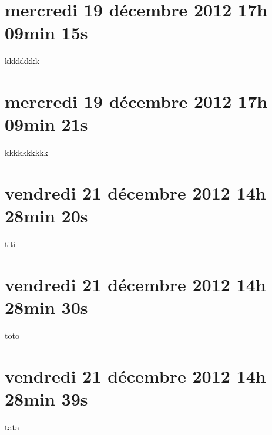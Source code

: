 
\section{mercredi 19 décembre 2012 17h 09min 15s}

kkkkkkkk

\section{mercredi 19 décembre 2012 17h 09min 21s}

kkkkkkkkkk

\section{vendredi 21 décembre 2012 14h 28min 20s}

titi

\section{vendredi 21 décembre 2012 14h 28min 30s}

toto

\section{vendredi 21 décembre 2012 14h 28min 39s}

tata
